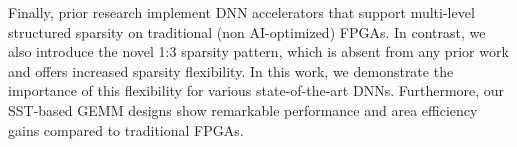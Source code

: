 Finally, prior research \cite{LSTM_fine_grained_sparsity_FPGA_2019, Fine_grained_structured_sparsity_FPL_2021, N_M_sparse_transformers_FPGA_VLSI_2022, Fine_grained_Neural_ODE_FPGA_2023, LAMPS_FCCM_2024} implement DNN accelerators that support multi-level structured sparsity on traditional (non AI-optimized) FPGAs. 
In contrast, we also introduce the novel 1:3 sparsity pattern, which is absent from any prior work and offers increased sparsity flexibility.
In this work, we demonstrate the importance of this flexibility for various state-of-the-art DNNs.
Furthermore, our SST-based GEMM designs show remarkable performance and area efficiency gains compared to traditional FPGAs.




























